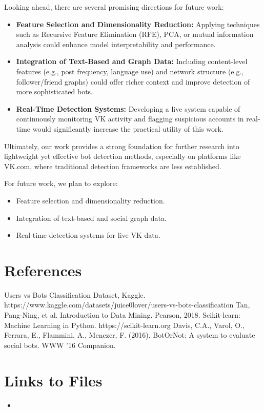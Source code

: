 \documentclass[conference]{IEEEtran}
\begin{document}
Looking ahead, there are several promising directions for future work:

\begin{itemize} \item \textbf{Feature Selection and Dimensionality Reduction:} Applying techniques such as Recursive Feature Elimination (RFE), PCA, or mutual information analysis could enhance model interpretability and performance. \item \textbf{Integration of Text-Based and Graph Data:} Including content-level features (e.g., post frequency, language use) and network structure (e.g., follower/friend graphs) could offer richer context and improve detection of more sophisticated bots. \item \textbf{Real-Time Detection Systems:} Developing a live system capable of continuously monitoring VK activity and flagging suspicious accounts in real-time would significantly increase the practical utility of this work. \end{itemize}

Ultimately, our work provides a strong foundation for further research into lightweight yet effective bot detection methods, especially on platforms like VK.com, where traditional detection frameworks are less established.


For future work, we plan to explore:
\begin{itemize}
    \item Feature selection and dimensionality reduction.
    \item Integration of text-based and social graph data.
    \item Real-time detection systems for live VK data.
\end{itemize}

\section{References}
\begin{thebibliography}{00}
 Users vs Bots Classification Dataset, Kaggle. https://www.kaggle.com/datasets/juice0lover/users-vs-bots-classification
 Tan, Pang-Ning, et al. Introduction to Data Mining. Pearson, 2018.
 Scikit-learn: Machine Learning in Python. https://scikit-learn.org
 Davis, C.A., Varol, O., Ferrara, E., Flammini, A., Menczer, F. (2016). BotOrNot: A system to evaluate social bots. WWW '16 Companion.
\end{thebibliography}

\section{Links to Files}
\begin{itemize}
    \item 
\end{itemize}
\end{document}
